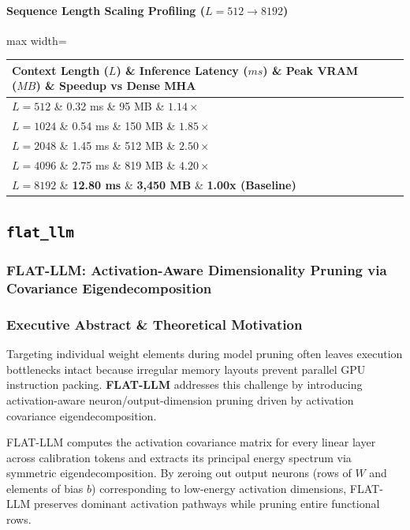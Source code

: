 \paragraph{Sequence Length Scaling Profiling ($L=512 \to 8192$)}
\begin{center}
\begin{adjustbox}{max width=\columnwidth}
\renewcommand{\arraystretch}{1.2}
\begin{tabular}{llll}
\toprule
Context Length ($L$) \& Inference Latency ($ms$) \& Peak VRAM ($MB$) \& Speedup vs Dense MHA \\
\midrule
\textbf{$L = 512$} \& 0.32 ms \& 95 MB \& $1.14\times$ \\
\textbf{$L = 1024$} \& 0.54 ms \& 150 MB \& $1.85\times$ \\
\textbf{$L = 2048$} \& 1.45 ms \& 512 MB \& $2.50\times$ \\
\textbf{$L = 4096$} \& 2.75 ms \& 819 MB \& $4.20\times$ \\
\textbf{$L = 8192$} \& \textbf{12.80 ms} \& \textbf{3,450 MB} \& \textbf{1.00x (Baseline)} \\


\bottomrule
\end{tabular}
\end{adjustbox}
\end{center}

\subsection{\texttt{flat\_llm}}
\subsubsection*{FLAT-LLM: Activation-Aware Dimensionality Pruning via Covariance Eigendecomposition}

\subsubsection*{Executive Abstract \& Theoretical Motivation}

Targeting individual weight elements during model pruning often leaves execution bottlenecks intact because irregular memory layouts prevent parallel GPU instruction packing. \textbf{FLAT-LLM} addresses this challenge by introducing activation-aware neuron/output-dimension pruning driven by activation covariance eigendecomposition.

FLAT-LLM computes the activation covariance matrix for every linear layer across calibration tokens and extracts its principal energy spectrum via symmetric eigendecomposition. By zeroing out output neurons (rows of $W$ and elements of bias $b$) corresponding to low-energy activation dimensions, FLAT-LLM preserves dominant activation pathways while pruning entire functional rows.

